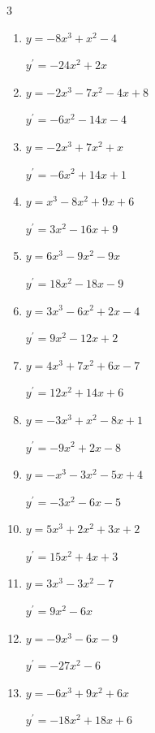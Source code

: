 \begin{multicols}{3}
\begin{enumerate}
  \item $y=-8x^{3}+x^{2}-4$

        $\displaystyle y^{\prime}=-24x^{2}+2x$

  \item $y=-2x^{3}-7x^{2}-4x+8$

        $\displaystyle y^{\prime}=-6x^{2}-14x-4$

  \item $y=-2x^{3}+7x^{2}+x$

        $\displaystyle y^{\prime}=-6x^{2}+14x+1$

  \item $y=x^{3}-8x^{2}+9x+6$

        $\displaystyle y^{\prime}=3x^{2}-16x+9$

  \item $y=6x^{3}-9x^{2}-9x$

        $\displaystyle y^{\prime}=18x^{2}-18x-9$

  \item $y=3x^{3}-6x^{2}+2x-4$

        $\displaystyle y^{\prime}=9x^{2}-12x+2$

  \item $y=4x^{3}+7x^{2}+6x-7$

        $\displaystyle y^{\prime}=12x^{2}+14x+6$

  \item $y=-3x^{3}+x^{2}-8x+1$

        $\displaystyle y^{\prime}=-9x^{2}+2x-8$

  \item $y=-x^{3}-3x^{2}-5x+4$

        $\displaystyle y^{\prime}=-3x^{2}-6x-5$

  \item $y=5x^{3}+2x^{2}+3x+2$

        $\displaystyle y^{\prime}=15x^{2}+4x+3$

  \item $y=3x^{3}-3x^{2}-7$

        $\displaystyle y^{\prime}=9x^{2}-6x$

  \item $y=-9x^{3}-6x-9$

        $\displaystyle y^{\prime}=-27x^{2}-6$

  \item $y=-6x^{3}+9x^{2}+6x$

        $\displaystyle y^{\prime}=-18x^{2}+18x+6$

\columnbreak %


\end{enumerate}
\end{multicols}
